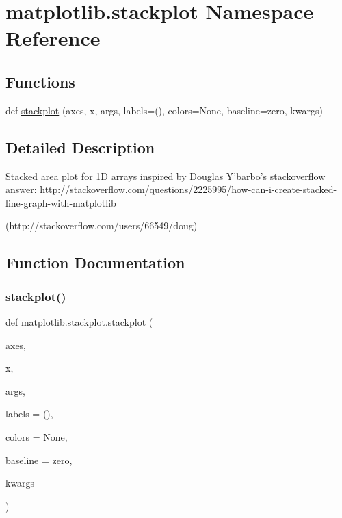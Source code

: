 \hypertarget{namespacematplotlib_1_1stackplot}{}\section{matplotlib.\+stackplot Namespace Reference}
\label{namespacematplotlib_1_1stackplot}
\subsection*{Functions}
\begin{DoxyCompactItemize}
\item 
def \hyperlink{namespacematplotlib_1_1stackplot_a2ce3c91999516e58be222afe154866af}{stackplot} (axes, x, args, labels=(), colors=None, baseline=\textquotesingle{}zero\textquotesingle{}, kwargs)
\end{DoxyCompactItemize}


\subsection{Detailed Description}
\begin{DoxyVerb}Stacked area plot for 1D arrays inspired by Douglas Y'barbo's stackoverflow
answer:
http://stackoverflow.com/questions/2225995/how-can-i-create-stacked-line-graph-with-matplotlib

(http://stackoverflow.com/users/66549/doug)
\end{DoxyVerb}
 

\subsection{Function Documentation}
\mbox{\label{namespacematplotlib_1_1stackplot_a2ce3c91999516e58be222afe154866af}} 
\subsubsection{\texorpdfstring{stackplot()}{stackplot()}}
{\footnotesize\ttfamily def matplotlib.\+stackplot.\+stackplot (\begin{DoxyParamCaption}\item[{}]{axes,  }\item[{}]{x,  }\item[{}]{args,  }\item[{}]{labels = {\ttfamily ()},  }\item[{}]{colors = {\ttfamily None},  }\item[{}]{baseline = {\ttfamily \textquotesingle{}zero\textquotesingle{}},  }\item[{}]{kwargs }\end{DoxyParamCaption})}

